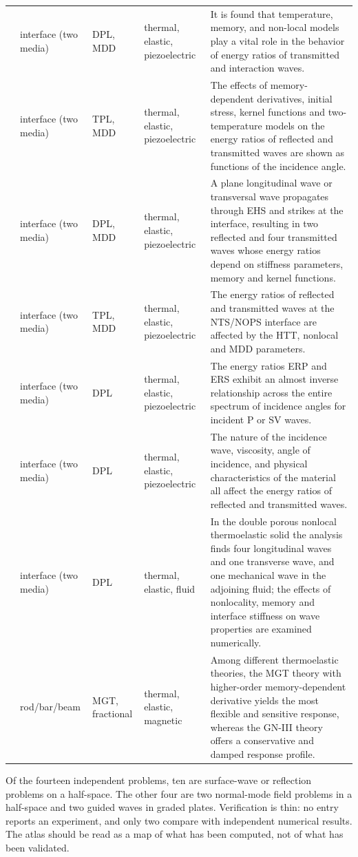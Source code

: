 {\begin{longtable}{p{1.9cm}p{2.0cm}p{1.7cm}p{2.6cm}p{5.0cm}}
\citet{Barak2023IJP} & interface (two media) & DPL, MDD & thermal, elastic, piezoelectric & It is found that temperature, memory, and non-local models play a vital role in the behavior of energy ratios of transmitted and interaction waves. \\
\citet{Barak2023JTS} & interface (two media) & TPL, MDD & thermal, elastic, piezoelectric & The effects of memory-dependent derivatives, initial stress, kernel functions and two-temperature models on the energy ratios of reflected and transmitted waves are shown as functions of the incidence angle. \\
\citet{Barak2023MMMS} & interface (two media) & DPL, MDD & thermal, elastic, piezoelectric & A plane longitudinal wave or transversal wave propagates through EHS and strikes at the interface, resulting in two reflected and four transmitted waves whose energy ratios depend on stiffness parameters, memory and kernel functions. \\
\citet{Gupta2023Energy} & interface (two media) & TPL, MDD & thermal, elastic, piezoelectric & The energy ratios of reflected and transmitted waves at the NTS/NOPS interface are affected by the HTT, nonlocal and MDD parameters. \\
\citet{Kumar2024} & interface (two media) & DPL & thermal, elastic, piezoelectric & The energy ratios ERP and ERS exhibit an almost inverse relationship across the entire spectrum of incidence angles for incident P or SV waves. \\
\citet{Kumar2024a} & interface (two media) & DPL & thermal, elastic, piezoelectric & The nature of the incidence wave, viscosity, angle of incidence, and physical characteristics of the material all affect the energy ratios of reflected and transmitted waves. \\
\citet{Kumar2025} & interface (two media) & DPL & thermal, elastic, fluid & In the double porous nonlocal thermoelastic solid the analysis finds four longitudinal waves and one transverse wave, and one mechanical wave in the adjoining fluid; the effects of nonlocality, memory and interface stiffness on wave properties are examined numerically. \\
\citet{Sur2025} & rod/bar/beam & MGT, fractional & thermal, elastic, magnetic & Among different thermoelastic theories, the MGT theory with higher-order memory-dependent derivative yields the most flexible and sensitive response, whereas the GN-III theory offers a conservative and damped response profile. \\
\end{longtable}
}

\begin{summarybox}[Summary]
Of the fourteen independent problems, ten are surface-wave or reflection problems on a half-space. The other four are two normal-mode field problems in a half-space and two guided waves in graded plates. Verification is thin: no entry reports an experiment, and only two compare with independent numerical results. The atlas should be read as a map of what has been computed, not of what has been validated.
\end{summarybox}
